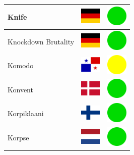 \documentclass[12pt, a4paper, twoside]{report}
\begin{document}
\begin{center}
\begin{longtable}{|p{5cm}|p{2cm}|p{2cm}|}
 Knife                                                      & \includegraphics[width=1cm]{../img/flags/de} &   \includegraphics[width=1cm]{../likes/y} \\ \hline
 Knockdown Brutality                                        & \includegraphics[width=1cm]{../img/flags/de} &   \includegraphics[width=1cm]{../likes/y} \\ \hline
 Komodo                                                     & \includegraphics[width=1cm]{../img/flags/pa} &   \includegraphics[width=1cm]{../likes/m} \\ \hline
 Konvent                                                    & \includegraphics[width=1cm]{../img/flags/dk} &   \includegraphics[width=1cm]{../likes/y} \\ \hline
 Korpiklaani                                                & \includegraphics[width=1cm]{../img/flags/fi} &   \includegraphics[width=1cm]{../likes/y} \\ \hline
 Korpse                                                     & \includegraphics[width=1cm]{../img/flags/nl} &   \includegraphics[width=1cm]{../likes/y} \\ \hline

\end{longtable}
\end{center}
\end{document}
